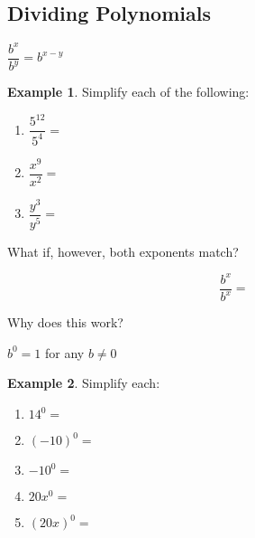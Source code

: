 \documentclass[addpoints,12pt]{exam}
\theoremstyle{definition}
\theoremstyle{break}
\theoremstyle{break}
\newtheorem{example}{Example}[subsection]
\begin{document}
\setcounter{section}{5}
\setcounter{subsection}{4}

\subsection{Dividing Polynomials}

\vspace{.15in}

\begin{definition}
$\dfrac{b^x}{b^y} = b^{x-y}$
\end{definition}

\vspace{.15in}

\begin{example}

Simplify each of the following:
\begin{enumerate}
\item $\dfrac{5^{12}}{5^4} = $
\vspace{.25in}
\item $\dfrac{x^9}{x^2} = $
\vspace{.25in}
\item $\dfrac{y^3}{y^5} = $
\vspace{.25in}
\end{enumerate}
\end{example}

\noindent What if, however, both exponents match?

\[\dfrac{b^x}{b^x} = \]

\noindent Why does this work?
\vspace{.75in}

\begin{definition}
$b^0 = 1$ for any $b \neq 0$
\end{definition}

\newpage

\begin{example}
Simplify each:
\begin{enumerate}
\item $14^0 = $
\vspace{.15in}
\item $(-10)^0 = $
\vspace{.15in}
\item $-10^0 = $
\vspace{.15in}
\item $20x^0 = $
\vspace{.15in}
\item $(20x)^0 = $
\vspace{.15in}
\end{enumerate}
\end{example}
\end{document}
